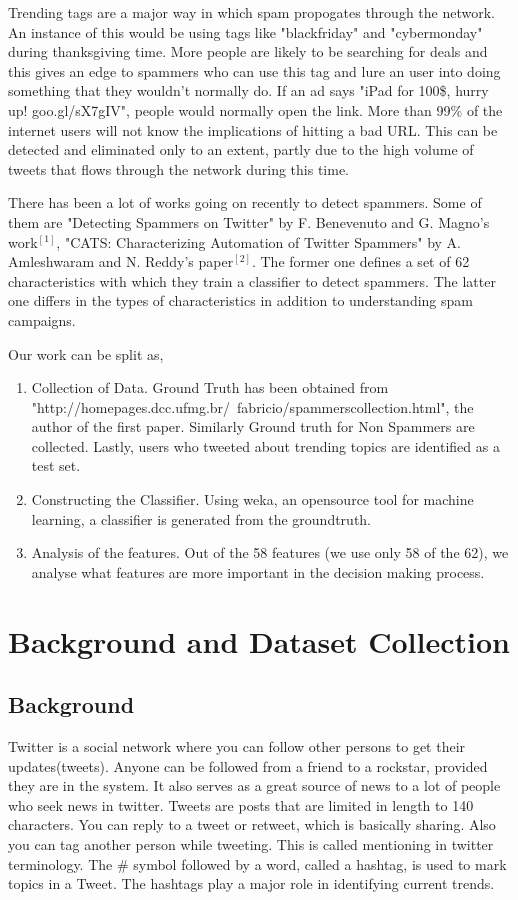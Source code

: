 \documentclass[11pt]{article}
\begin{document}
Trending tags are a major way in which spam propogates through the network. An instance of this would be using tags like "blackfriday" and "cybermonday" during thanksgiving time. More people are likely to be searching for deals and this gives an edge to spammers who can use this tag and lure an user into doing something that they wouldn't normally do. If an ad says "iPad for 100\$, hurry up! goo.gl/sX7gIV", people would normally open the link. More than 99\% of the internet users will not know the implications of hitting a bad URL. This can be detected and eliminated only to an extent, partly due to the high volume of tweets that flows through the network during this time.

There has been a lot of works going on recently to detect spammers. Some of them are "Detecting Spammers on Twitter" by F. Benevenuto and G. Magno's work$^{[1]}$, "CATS: Characterizing Automation of Twitter Spammers" by A. Amleshwaram and N. Reddy's paper$^{[2]}$. The former one defines a set of 62 characteristics with which they train a classifier to detect spammers. The latter one differs in the types of characteristics in addition to understanding spam campaigns.

Our work can be split as,
\begin{enumerate}
\item Collection of Data. Ground Truth has been obtained from "http://homepages.dcc.ufmg.br/~fabricio/spammerscollection.html", the author of the first paper. Similarly Ground truth for Non Spammers are collected. Lastly, users who tweeted about trending topics are identified as a test set.
\item Constructing the Classifier. Using weka, an opensource tool for machine learning, a classifier is generated from the groundtruth.
\item Analysis of the features. Out of the 58 features (we use only 58 of the 62), we analyse what features are more important in the decision making process.
\end{enumerate}
\section{Background and Dataset Collection}
\subsection{Background}
Twitter is a social network where you can follow other persons to get their updates(tweets). Anyone can be followed from a friend to a rockstar, provided they are in the system. It also serves as a great source of news to a lot of people who seek news in twitter. Tweets are posts that are limited in length to 140 characters. You can reply to a tweet or retweet, which is basically sharing. Also you can tag another person while tweeting. This is called mentioning in twitter terminology. The \# symbol followed by a word, called a hashtag, is used to mark  topics in a Tweet. The hashtags play a major role in identifying current trends.
\end{document}
